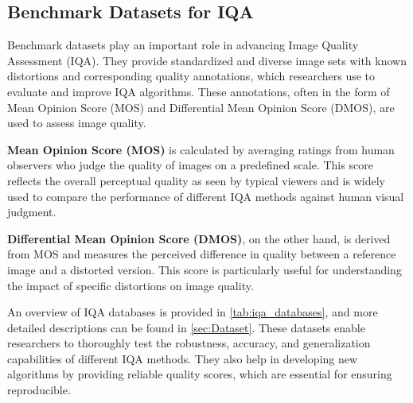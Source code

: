 \subsection{Benchmark Datasets for IQA}
\label{sub:BenchmarkDatasetsIQA}
Benchmark datasets play an important role in advancing Image Quality Assessment (IQA). They provide standardized and diverse image sets with known distortions and corresponding quality annotations, which researchers use to evaluate and improve IQA algorithms. These annotations, often in the form of Mean Opinion Score (MOS) and Differential Mean Opinion Score (DMOS),  are used to assess image quality. \par
\vspace{\baselineskip}
\noindent
\textbf{Mean Opinion Score (MOS)} is calculated by averaging ratings from human observers who judge the quality of images on a predefined scale. This score reflects the overall perceptual quality as seen by typical viewers and is widely used to compare the performance of different IQA methods against human visual judgment. \par
\vspace{\baselineskip}
\noindent
\textbf{Differential Mean Opinion Score (DMOS)}, on the other hand, is derived from MOS and measures the perceived difference in quality between a reference image and a distorted version. This score is particularly useful for understanding the impact of specific distortions on image quality. \par
\vspace{\baselineskip}
\noindent
An overview of IQA databases is provided in \autoref{tab:iqa_databases}, and more detailed descriptions can be found in \autoref{sec:Dataset}. These datasets enable researchers to thoroughly test the robustness, accuracy, and generalization capabilities of different IQA methods. They also help in developing new algorithms by providing reliable quality scores, which are essential for ensuring reproducible. \par

